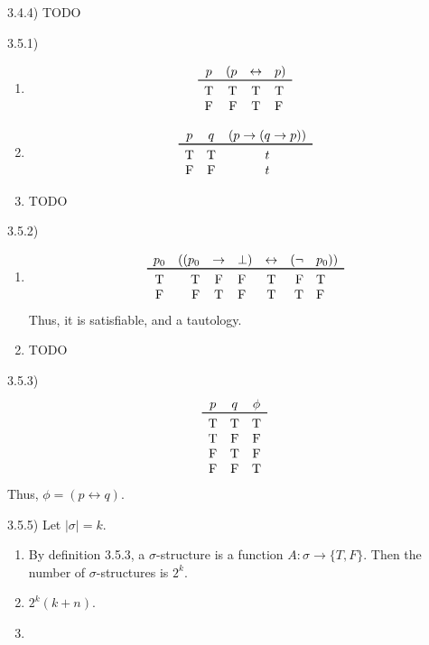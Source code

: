 \documentclass{article}
\theoremstyle{definition}
\newcommand{\ra}{\rightarrow}
\newcommand{\lra}{\leftrightarrow}
\newcommand{\true}{\text{T}}
\newcommand{\false}{\text{F}}
\begin{document}
3.4.4) TODO

3.5.1)
\begin{enumerate}
  \item
\[
  \begin{array}{crcl}
    p & (p & \lra & p) \\
    \toprule
    \true & \true & \true & \true \\
    \false & \false & \true & \false \\
  \end{array}
\]
  \item
\[
  \begin{array}{ccc}
    p & q & (p \ra (q \ra p)) \\
    \toprule
    \true & \true & t\\
    \false & \false & t\\
  \end{array}
\]
\item TODO
\end{enumerate}
3.5.2)
\begin{enumerate}
  \item
\[
  \begin{array}{crclcrl}
    p_0 & ((p_0 & \ra & \bot) & \lra & (\neg & p_0)) \\
    \toprule
    \true & \true & \false & \false & \true & \false & \true \\
    \false & \false & \true & \false & \true & \true & \false \\
  \end{array}
\]
Thus, it is satisfiable, and a tautology.
  \item TODO
\end{enumerate}

3.5.3)
\[
  \begin{array}{ccc}
    p & q & \phi \\
    \toprule
    \true & \true & \true \\
    \true & \false & \false \\
    \false & \true & \false \\
    \false & \false & \true \\
  \end{array}
\]
Thus, \(\phi = (p \lra q)\).

3.5.5) Let \(|\sigma| = k\).
\begin{enumerate}
  \item By definition 3.5.3, a \(\sigma\)-structure is a function \(A\colon
  \sigma \to \{T, F\}\). Then the number of \(\sigma\)-structures is \(2^k\).
  \item \(2^k(k+n)\).
  \item
\end{enumerate}

\newpage


\end{document}
